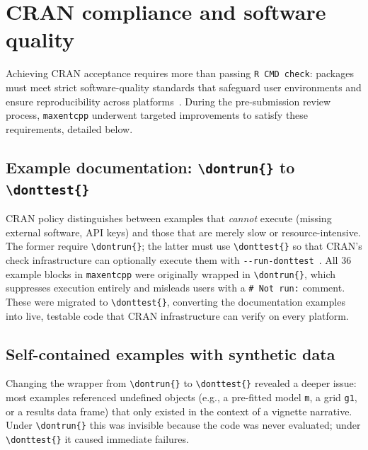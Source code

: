 \documentclass[10pt,letterpaper]{article}
\begin{document}
\section*{CRAN compliance and software quality}

Achieving CRAN acceptance requires more than passing \texttt{R CMD check}:
packages must meet strict software-quality standards that safeguard user
environments and ensure reproducibility across
platforms~\cite{CRANPolicy2024,WRE2024}.
During the pre-submission review process, \texttt{maxentcpp} underwent
targeted improvements to satisfy these requirements, detailed below.

\subsection*{Example documentation: \texttt{\textbackslash dontrun\{\}}
to \texttt{\textbackslash donttest\{\}}}

CRAN policy distinguishes between examples that \emph{cannot} execute
(missing external software, API keys) and those that are merely slow or
resource-intensive.
The former require \texttt{\textbackslash dontrun\{\}}; the latter must
use \texttt{\textbackslash donttest\{\}} so that CRAN's check
infrastructure can optionally execute them with
\texttt{-{}-run-donttest}~\cite{CRANcookbook2024}.
All 36 example blocks in \texttt{maxentcpp} were originally wrapped in
\texttt{\textbackslash dontrun\{\}}, which suppresses execution entirely
and misleads users with a \texttt{\# Not run:} comment.
These were migrated to \texttt{\textbackslash donttest\{\}}, converting
the documentation examples into live, testable code that CRAN
infrastructure can verify on every platform.

\subsection*{Self-contained examples with synthetic data}

Changing the wrapper from \texttt{\textbackslash dontrun\{\}} to
\texttt{\textbackslash donttest\{\}} revealed a deeper issue: most
examples referenced undefined objects (e.g., a pre-fitted model
\texttt{m}, a grid \texttt{g1}, or a results data frame) that only
existed in the context of a vignette narrative.
Under \texttt{\textbackslash dontrun\{\}} this was invisible because
the code was never evaluated; under \texttt{\textbackslash donttest\{\}}
it caused immediate failures.
\end{document}
